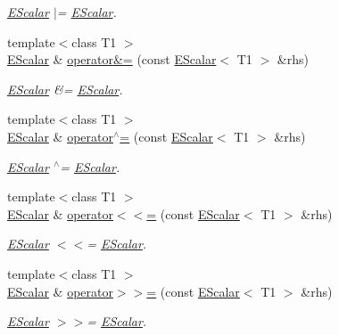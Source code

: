 \begin{DoxyCompactItemize}
\begin{DoxyCompactList}\small\item\em \mbox{\hyperlink{classENSEM_1_1EScalar}{E\+Scalar}} $\vert$= \mbox{\hyperlink{classENSEM_1_1EScalar}{E\+Scalar}}. \end{DoxyCompactList}\item 
{\footnotesize template$<$class T1 $>$ }\\\mbox{\hyperlink{classENSEM_1_1EScalar}{E\+Scalar}} \& \mbox{\hyperlink{classENSEM_1_1EScalar_a4e16e2cecacdfefd6f01dcc360c6945b}{operator\&=}} (const \mbox{\hyperlink{classENSEM_1_1EScalar}{E\+Scalar}}$<$ T1 $>$ \&rhs)
\begin{DoxyCompactList}\small\item\em \mbox{\hyperlink{classENSEM_1_1EScalar}{E\+Scalar}} \&= \mbox{\hyperlink{classENSEM_1_1EScalar}{E\+Scalar}}. \end{DoxyCompactList}\item 
{\footnotesize template$<$class T1 $>$ }\\\mbox{\hyperlink{classENSEM_1_1EScalar}{E\+Scalar}} \& \mbox{\hyperlink{classENSEM_1_1EScalar_a42c2a63d2eda81643ae8145068db3a8e}{operator$^\wedge$=}} (const \mbox{\hyperlink{classENSEM_1_1EScalar}{E\+Scalar}}$<$ T1 $>$ \&rhs)
\begin{DoxyCompactList}\small\item\em \mbox{\hyperlink{classENSEM_1_1EScalar}{E\+Scalar}} $^\wedge$= \mbox{\hyperlink{classENSEM_1_1EScalar}{E\+Scalar}}. \end{DoxyCompactList}\item 
{\footnotesize template$<$class T1 $>$ }\\\mbox{\hyperlink{classENSEM_1_1EScalar}{E\+Scalar}} \& \mbox{\hyperlink{classENSEM_1_1EScalar_a29ea96dc5698e4541307d65a0f1dfe6e}{operator$<$$<$=}} (const \mbox{\hyperlink{classENSEM_1_1EScalar}{E\+Scalar}}$<$ T1 $>$ \&rhs)
\begin{DoxyCompactList}\small\item\em \mbox{\hyperlink{classENSEM_1_1EScalar}{E\+Scalar}} $<$$<$= \mbox{\hyperlink{classENSEM_1_1EScalar}{E\+Scalar}}. \end{DoxyCompactList}\item 
{\footnotesize template$<$class T1 $>$ }\\\mbox{\hyperlink{classENSEM_1_1EScalar}{E\+Scalar}} \& \mbox{\hyperlink{classENSEM_1_1EScalar_a0e520529327800038c3775d195819b6f}{operator$>$$>$=}} (const \mbox{\hyperlink{classENSEM_1_1EScalar}{E\+Scalar}}$<$ T1 $>$ \&rhs)
\begin{DoxyCompactList}\small\item\em \mbox{\hyperlink{classENSEM_1_1EScalar}{E\+Scalar}} $>$$>$= \mbox{\hyperlink{classENSEM_1_1EScalar}{E\+Scalar}}. \end{DoxyCompactList}\item 

\end{DoxyCompactItemize}
